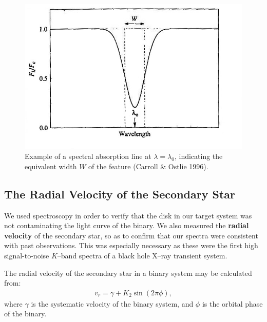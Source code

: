 \begin{figure}[!htb]
\begin{center}
\includegraphics[width=5.0in]{CarrollEquiv}
\caption{%
Example of a spectral absorption line at $\lambda=\lambda_0$,
indicating the equivalent width $W$ of the
feature (Carroll \& Ostlie 1996). }%
\label{cha:InfraredDataReductionTechniques:sec:Spectroscopy:subsec:EquivalentWidth:fig:CarrollEquiv}
\end{center}
\end{figure}

\nocite{CarrollOstlie:1996}


\subsection{The Radial Velocity of the Secondary Star}
\label{cha:InfraredDataReductionTechniques:sec:Spectroscopy:subsec:RadialVelocity}

We used spectroscopy in order to verify that the disk in our target system was not contaminating the light curve of the binary. We also measured the \textbf{radial velocity} of the secondary star, so as to confirm that our spectra were consistent with past observations. This was especially necessary as these were the first high signal-to-noise $K$--band spectra of a black hole X--ray
transient system.

\vspace{\myparskip}

The radial velocity of the secondary star in a
binary system may be calculated from:
\begin{eqnarray}
\label{cha:InfraredDataReductionTechniques:sec:Spectroscopy:subsec:RadialVelocity:eqn:Vr}
v_r = \gamma + K_2 \sin{(2\pi\phi)},
\end{eqnarray}
where $\gamma$ is the systematic velocity of the binary system, and
$\phi$ is the orbital phase of the binary.

